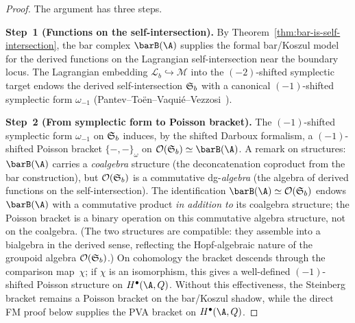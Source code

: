 \begin{proof}
The argument has three steps.

\smallskip
\noindent\textbf{Step~1 (Functions on the self-intersection).}
By Theorem~\ref{thm:bar-is-self-intersection}, the bar complex
$\barB(\A)$ supplies the formal bar/Koszul model for the derived
functions on the Lagrangian self-intersection near the boundary
locus.
The Lagrangian embedding
$\mathscr{L}_b \hookrightarrow \mathscr{M}$ into the $(-2)$-shifted
symplectic target endows the derived self-intersection $\mathfrak{S}_b$ with a
canonical $(-1)$-shifted symplectic form $\omega_{-1}$
(Pantev--To\"en--Vaqui\'e--Vezzosi~\cite{PTVV13}).

\smallskip
\noindent\textbf{Step~2 (From symplectic form to Poisson bracket).}
The $(-1)$-shifted symplectic form $\omega_{-1}$ on $\mathfrak{S}_b$ induces,
by the shifted Darboux formalism, a $(-1)$-shifted Poisson bracket
$\{-,-\}_{\omega}$ on $\mathcal{O}(\Steinb_b) \simeq \barB(\A)$.
A remark on structures: $\barB(\A)$ carries a
\emph{coalgebra} structure (the deconcatenation coproduct from the
bar construction), but $\mathcal{O}(\mathfrak{S}_b)$ is a commutative
dg-\emph{algebra} (the algebra of derived functions on the
self-intersection). The identification
$\barB(\A) \simeq \mathcal{O}(\Steinb_b)$ endows $\barB(\A)$ with
a commutative product \emph{in addition to} its coalgebra structure;
the Poisson bracket is a binary operation on this commutative
algebra structure, not on the coalgebra. (The two structures are
compatible: they assemble into a bialgebra in the derived sense,
reflecting the Hopf-algebraic nature of the groupoid algebra
$\mathcal{O}(\mathfrak{S}_b)$.)
On cohomology the bracket descends through the comparison map~$\chi$;
if $\chi$ is an isomorphism, this gives a well-defined
$(-1)$-shifted Poisson structure on $H^\bullet(\A,Q)$. Without this
effectiveness, the Steinberg bracket remains a Poisson bracket on the
bar/Koszul shadow, while the direct FM proof below supplies the PVA
bracket on \(H^\bullet(\A,Q)\).


\end{proof}
